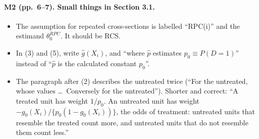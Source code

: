\documentclass[11pt]{article}
\theoremstyle{plain}
\theoremstyle{remark}
\begin{document}
\paragraph{M2 (pp.~6--7). Small things in Section 3.1.}
\begin{itemize}
\item The assumption for repeated cross-sections is labelled ``RPC(i)'' and the
  estimand $\theta_0^{RPC}$. It should be RCS.
\item In (3) and (5), write $\hat g(X_i)$, and
  ``where $\hat p$ estimates $p_0\equiv P(D=1)$'' instead of ``$\hat p$ is the
  calculated constant $p_0$''.
\item The paragraph after (2) describes the untreated twice (``For the
  untreated, whose values \dots\ Conversely for the untreated''). Shorter and
  correct: ``A treated unit has weight $1/p_0$. An untreated unit has weight
  $-g_0(X_i)/\{p_0(1-g_0(X_i))\}$, the odds of treatment: untreated units that
  resemble the treated count more, and untreated units that do not resemble them
  count less.''
\end{itemize}
\end{document}
